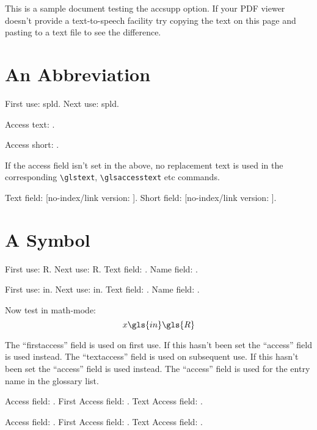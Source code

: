 \documentclass{article}
\begin{document}
This is a sample document testing the accsupp option.
If your PDF viewer doesn't provide a text-to-speech facility
try copying the text on this page and pasting to a text file 
to see the difference.

\section{An Abbreviation}

First use: \gls{spld}.
Next use: \gls{spld}.

Access text: .

Access short: .

If the access field isn't set in the above, no replacement text 
is used in the corresponding \verb|\glstext|, \verb|\glsaccesstext| etc commands.

Text field:  [no-index/link version: ].
Short field:  [no-index/link version: ].

\section{A Symbol}

First use: \gls{R}. Next use: \gls{R}.
Text field: . Name field: .

First use: \gls{in}. Next use: \gls{in}.
Text field: . Name field: .

Now test in math-mode:
\[
x \gls{in} \gls{R}
\]

The ``firstaccess'' field is used on first use. If this hasn't
been set the ``access'' field is used instead. The ``textaccess''
field is used on subsequent use. If this hasn't been set the
``access'' field is used instead. The ``access'' field is used
for the entry name in the glossary list.

Access field: .
First Access field: .
Text Access field: .

Access field: .
First Access field: .
Text Access field: .

\printglossaries
\end{document}
